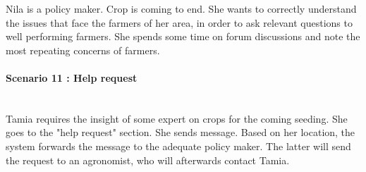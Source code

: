 Nila is a policy maker. Crop is coming to end. She wants to correctly understand the issues that face the farmers of her area, in order to ask relevant questions to well performing farmers. She spends some time on forum discussions and note the most repeating concerns of farmers.

\paragraph{Scenario 11 : Help request}\mbox{} \\

Tamia requires the insight of some expert on crops for the coming seeding. She goes to the "help request" section. She sends message. Based on her location, the system forwards the message to the adequate policy maker. The latter will send the request to an agronomist, who will afterwards contact Tamia.



